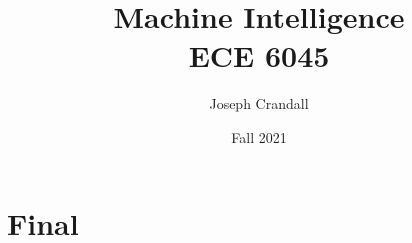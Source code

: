 
\usepackage{algorithm, algpseudocode, color, gensymb, siunitx, soul, subfiles}
\usepackage[a4paper, total={7.5in, 10in}]{geometry}

\title{Machine Intelligence\\
\large ECE 6045}
\author{Joseph Crandall}
\date{Fall 2021}


\maketitle

%

%

%

\section{Final}




